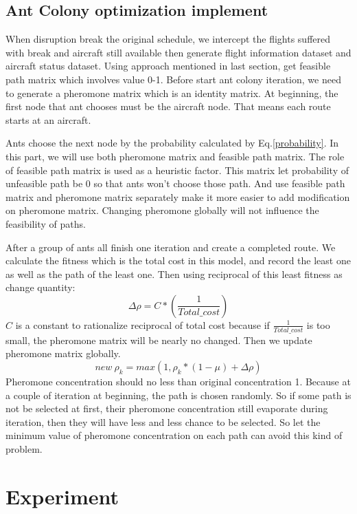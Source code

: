 \documentclass[senior]{IPSstyle}
\begin{document}
\section{Ant Colony optimization implement}
When disruption break the original schedule, we intercept the flights suffered with break and aircraft still available then generate flight information dataset and aircraft status dataset. Using approach mentioned in last section, get feasible path matrix which involves value 0-1. 
Before start ant colony iteration, we need to generate a 
pheromone matrix which is an identity matrix.
At beginning, the first node that ant chooses must be the aircraft node. That means each route starts at an aircraft.

Ants choose the next node by the probability calculated by Eq.\ref{probability}. In this part, we will use both pheromone matrix and feasible path matrix.
The role of feasible path matrix is used as a heuristic factor. This matrix let probability of unfeasible path be 0 so that ants won't choose those path. And use feasible path matrix and pheromone matrix separately make it more easier to add modification on pheromone matrix. Changing pheromone globally will not influence the feasibility of paths.

After a group of ants all finish one iteration and create a completed route. We calculate the fitness which is the total cost in this model, and record the least one as well as the path of the least one. Then using reciprocal of this least fitness as change quantity:
\begin{equation}\label{func:delta pheromone}
    \Delta\rho = C * \left( \frac{1}{Total\_cost} \right)
\end{equation}
\(C\) is a constant to rationalize reciprocal of total cost because if $\frac{1}{Total\_cost}$ is too small, the pheromone matrix will be nearly no changed. Then we update pheromone matrix globally. 
\begin{equation}
    new\ \rho_k = max(1, \rho_k * (1-\mu) + \Delta\rho)
\end{equation}
Pheromone concentration should no less than original concentration 1. Because at a couple of iteration at beginning, the path is chosen randomly. So if some path is not be selected at first, their pheromone concentration still evaporate during iteration, then they will have less and less chance to be selected. So let the minimum value of pheromone concentration on each path can avoid this kind of problem.


\chapter{Experiment} \label{Experiment}
\end{document}
